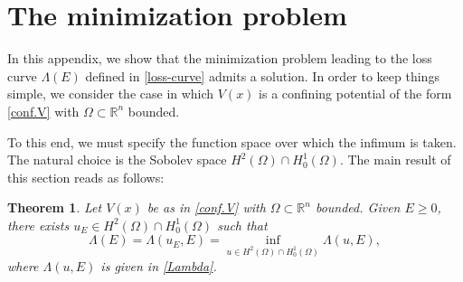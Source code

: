\documentclass[reprint,superscriptaddress,aps,prl]{revtex4-2}
\newcommand{\R}{\mathbb{R}}
\newtheorem{teo}{Theorem}
\begin{document}


\appendix

\section{The minimization problem}

In this appendix, we show that the minimization problem leading to the loss curve $\Lambda(E)$ defined in \eqref{loss-curve} admits a solution. In order to keep things simple, we consider the case in which $V(x)$ is a confining potential of the form \eqref{conf.V} with $\Omega\subset \R^n$ bounded.

To this end, we must specify the function space over which the infimum is taken. The natural choice is the Sobolev space $H^2(\Omega) \cap H^1_0(\Omega)$. The main result of this section reads as follows:

\begin{teo}\label{teo.min}
Let $V(x)$ be as in \eqref{conf.V} with $\Omega\subset \R^n$ bounded. Given $E\ge 0$, there exists $u_E\in H^2(\Omega)\cap H^1_0(\Omega)$ such that
$$
\Lambda(E) = \Lambda(u_E, E) = \inf_{u\in H^2(\Omega)\cap H^1_0(\Omega)}\Lambda(u, E),
$$
where $\Lambda(u, E)$ is given in \eqref{Lambda}.
\end{teo}
\end{document}
